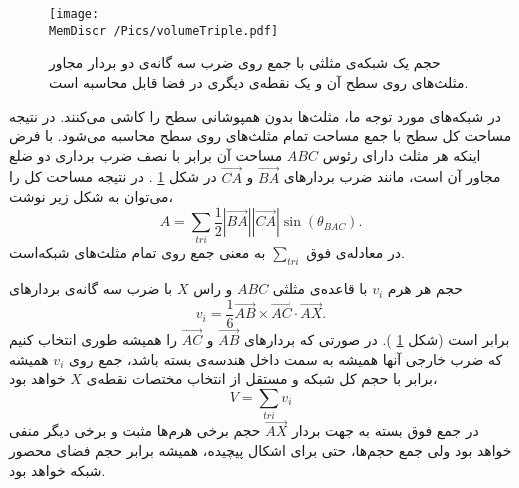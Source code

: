\begin{figure}[h]
\begin{center}
\texttt{[image: \\MemDiscr /Pics/volumeTriple.pdf]}
\caption{
حجم یک شبکه‌ی مثلثی با جمع روی ضرب سه گانه‌ی دو بردار مجاور مثلث‌های روی سطح آن و یک نقطه‌ی دیگری در فضا قابل محاسبه است.
}
\label{fig:volumeTriple}
\end{center}
\end{figure}


در شبکه‌های مورد توجه ما، مثلث‌ها بدون همپوشانی سطح را کاشی می‌کنند. در نتیجه مساحت کل سطح با جمع مساحت تمام مثلث‌های روی سطح محاسبه می‌شود. با فرض اینکه هر مثلث دارای رئوس
$ABC$
مساحت آن برابر با نصف ضرب برداری دو ضلع مجاور آن است، مانند ضرب بردارهای 
$\overrightarrow{BA}$
و
$\overrightarrow{CA}$
در شکل 
\ref{fig:volumeTriple}
. در نتیجه مساحت کل را می‌توان به شکل زیر نوشت،
\begin{equation}
A =\sum_{tri}\frac{1}{2}|\overrightarrow{BA}||\overrightarrow{CA}|\sin(\theta_{BAC}).
\label{eq:areaSum}
\end{equation}
در معادله‌ی فوق
$\sum_{tri}$
به معنی جمع روی تمام مثلث‌های شبکه‌است. 

حجم هر هرم
$v_i$
با قاعده‌ی مثلثی
$ABC$
و راس
$X$
 با ضرب سه گانه‌ی بردارهای
\begin{equation}
v_i=\frac{1}{6}\overrightarrow{AB}\times\overrightarrow{AC}\cdot\overrightarrow{AX}.
\label{eq:tripleProduct}
\end{equation}
برابر است (شکل 
\ref{fig:volumeTriple}
). در صورتی که بردارهای
$\overrightarrow {AB}$
و
$\overrightarrow {AC}$
را همیشه‌ طوری انتخاب کنیم که ضرب خارجی‌ آنها همیشه به سمت داخل هندسه‌ی بسته باشد، جمع روی 
$v_i$
همیشه برابر با حجم کل شبکه‌ و مستقل از انتخاب مختصات نقطه‌ی 
$X$
 خواهد بود،
 \begin{equation}
V= \sum_{tri} v_i
\label{eq:volumeSum}
\end{equation}
در جمع فوق بسته به جهت بردار
$\overrightarrow {AX}$
حجم برخی هرم‌ها مثبت و برخی دیگر منفی خواهد بود ولی جمع حجم‌ها، حتی برای اشکال پیچیده، همیشه برابر حجم فضای محصور شبکه خواهد بود.

